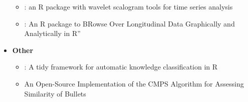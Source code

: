 \begin{itemize}
  \begin{itemize}
  \tightlist
  \item
    : an R package with wavelet scalogram tools for
    time series analysis
  \item
    : An R package to BRowse Over Longitudinal Data
    Graphically and Analytically in R''
  \end{itemize}
\item
  \textbf{Other}

  \begin{itemize}
  \tightlist
  \item
    : A tidy framework for automatic knowledge classification
    in R
  \item
    An Open-Source Implementation of the CMPS Algorithm for Assessing
    Similarity of Bullets
  \end{itemize}
\end{itemize}


\address{%
Catherine Hurley\\
Maynooth University\\%
\\
%
\url{https://journal.r-project.org}\\%
%
\href{mailto:r-journal@r-project.org}{\nolinkurl{r-journal@r-project.org}}%
}
